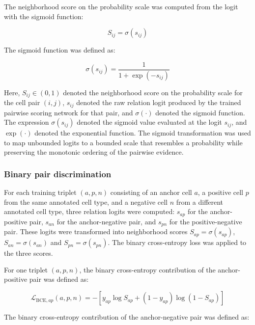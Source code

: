 \documentclass[11pt]{article}
\begin{document}
The neighborhood score on the probability scale was computed from the logit with the sigmoid function:

\begin{equation}
S_{ij}=\sigma(s_{ij})
  \label{eq:S}
\end{equation}

The sigmoid function was defined as:

\begin{equation}
\sigma(s_{ij})=
\frac{1}
{1+\exp(-s_{ij})}
  \label{eq:sigma}
\end{equation}

Here, \(S_{ij}\in(0,1)\) denoted the neighborhood score on the probability scale for the cell pair \((i,j)\), \(s_{ij}\) denoted the raw relation logit produced by the trained pairwise scoring network for that pair, and \(\sigma(\cdot)\) denoted the sigmoid function. The expression \(\sigma(s_{ij})\) denoted the sigmoid value evaluated at the logit \(s_{ij}\), and \(\exp(\cdot)\) denoted the exponential function. The sigmoid transformation was used to map unbounded logits to a bounded scale that resembles a probability while preserving the monotonic ordering of the pairwise evidence.

\subsubsection*{Binary pair discrimination}

For each training triplet \((a,p,n)\) consisting of an anchor cell \(a\), a positive cell \(p\) from the same annotated cell type, and a negative cell \(n\) from a different annotated cell type, three relation logits were computed: \(s_{ap}\) for the anchor-positive pair, \(s_{an}\) for the anchor-negative pair, and \(s_{pn}\) for the positive-negative pair. These logits were transformed into neighborhood scores \(S_{ap}=\sigma(s_{ap})\), \(S_{an}=\sigma(s_{an})\) and \(S_{pn}=\sigma(s_{pn})\). The binary cross-entropy loss was applied to the three scores.

For one triplet \((a,p,n)\), the binary cross-entropy contribution of the anchor-positive pair was defined as:

\begin{equation}
\mathcal{L}_{\mathrm{BCE},ap}(a,p,n)=
-
\left[
y_{ap}\log S_{ap}
+
(1-y_{ap})\log(1-S_{ap})
\right]
  \label{eq:BCE_ap}
\end{equation}

The binary cross-entropy contribution of the anchor-negative pair was defined as:
\end{document}
